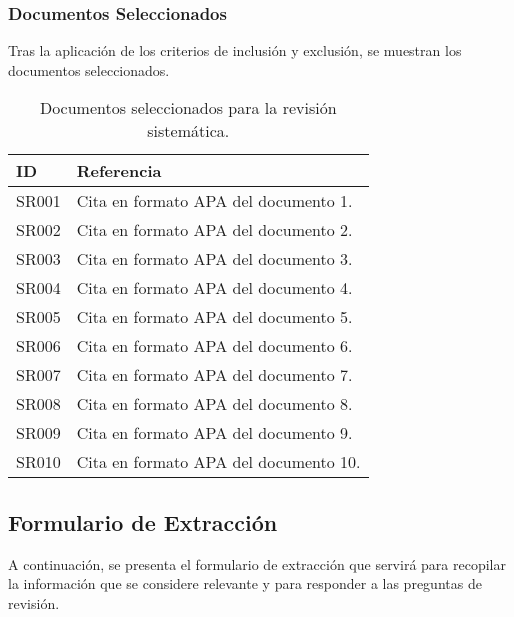 \subsubsection{Documentos Seleccionados}
\label{subsubsec:documentos-seleccionados}

Tras la aplicación de los criterios de inclusión y exclusión, se muestran los documentos seleccionados.

\begin{table}[h!]
      \centering
      {\scriptsize
            \begin{tabular}{|p{1cm}|p{13cm}|}
                  \hline
                  \textbf{ID} & \textbf{Referencia}                   \\ \hline
                  SR001       & Cita en formato APA del documento 1.  \\ \hline
                  SR002       & Cita en formato APA del documento 2.  \\ \hline
                  SR003       & Cita en formato APA del documento 3.  \\ \hline
                  SR004       & Cita en formato APA del documento 4.  \\ \hline
                  SR005       & Cita en formato APA del documento 5.  \\ \hline
                  SR006       & Cita en formato APA del documento 6.  \\ \hline
                  SR007       & Cita en formato APA del documento 7.  \\ \hline
                  SR008       & Cita en formato APA del documento 8.  \\ \hline
                  SR009       & Cita en formato APA del documento 9.  \\ \hline
                  SR010       & Cita en formato APA del documento 10. \\ \hline
            \end{tabular}
      }
      \caption{Documentos seleccionados para la revisión sistemática.}
      \label{tab:documentos-seleccionados}
\end{table}

\clearpage
\subsection{Formulario de Extracción}
\label{subsec:formulario-extraccion}

A continuación, se presenta el formulario de extracción que servirá para recopilar la información que se considere
relevante y para responder a las preguntas de revisión.

